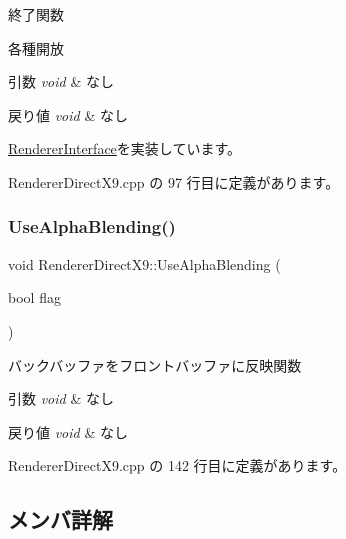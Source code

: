 終了関数 

各種開放 
\begin{DoxyParams}{引数}
{\em void} & なし \\
\hline
\end{DoxyParams}

\begin{DoxyRetVals}{戻り値}
{\em void} & なし \\
\hline
\end{DoxyRetVals}


\mbox{\hyperlink{class_renderer_interface_ada105489f9db98e7e9542b278699d558}{Renderer\+Interface}}を実装しています。



 Renderer\+Direct\+X9.\+cpp の 97 行目に定義があります。

\mbox{\label{class_renderer_direct_x9_aa555dda63bdc0f4dfc28ac506d6e8d60}} 
\subsubsection{\texorpdfstring{Use\+Alpha\+Blending()}{UseAlphaBlending()}}
{\footnotesize\ttfamily void Renderer\+Direct\+X9\+::\+Use\+Alpha\+Blending (\begin{DoxyParamCaption}\item[{bool}]{flag }\end{DoxyParamCaption})}



バックバッファをフロントバッファに反映関数 


\begin{DoxyParams}{引数}
{\em void} & なし \\
\hline
\end{DoxyParams}

\begin{DoxyRetVals}{戻り値}
{\em void} & なし \\
\hline
\end{DoxyRetVals}


 Renderer\+Direct\+X9.\+cpp の 142 行目に定義があります。



\subsection{メンバ詳解}
\mbox{\label{class_renderer_direct_x9_aba9ae366d583e965418423ec76454a61}} 
